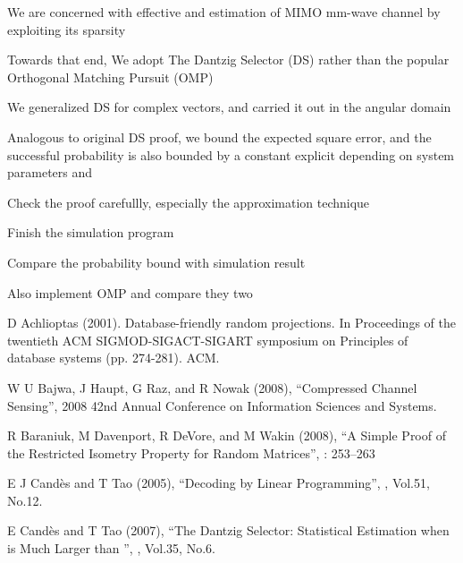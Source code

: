 {
\I We are concerned with effective and estimation of MIMO mm-wave channel by exploiting its sparsity

\I Towards that end, We adopt The Dantzig Selector (DS) rather than the popular Orthogonal Matching Pursuit (OMP)

\I We generalized DS for complex vectors, and carried it out in the angular domain

\I Analogous to original DS proof, we bound the expected square error, and the successful probability is also bounded by a constant explicit depending on system parameters  and 
}
{
\I Check the proof carefullly, especially the approximation technique

\I Finish the simulation program

\I Compare the probability bound with simulation result

\I Also implement OMP and compare they two
}
{
{\tfx
\I D Achlioptas (2001). Database-friendly random projections. In Proceedings of the twentieth ACM SIGMOD-SIGACT-SIGART symposium on Principles of database systems (pp. 274-281). ACM.

\I W U Bajwa, J Haupt, G Raz, and R Nowak (2008), ``Compressed Channel Sensing'', 2008 42nd Annual Conference on Information Sciences and Systems.

\I R Baraniuk, M Davenport, R DeVore, and M Wakin (2008), ``A Simple Proof of the Restricted Isometry Property for Random Matrices'',  : 253–263

\I E J Cand\`es and T Tao (2005), ``Decoding by Linear Programming'', , Vol.51, No.12.

\I E Cand\`es and T Tao (2007), ``The Dantzig Selector: Statistical Estimation when  is Much Larger than '', , Vol.35, No.6.
}
}

